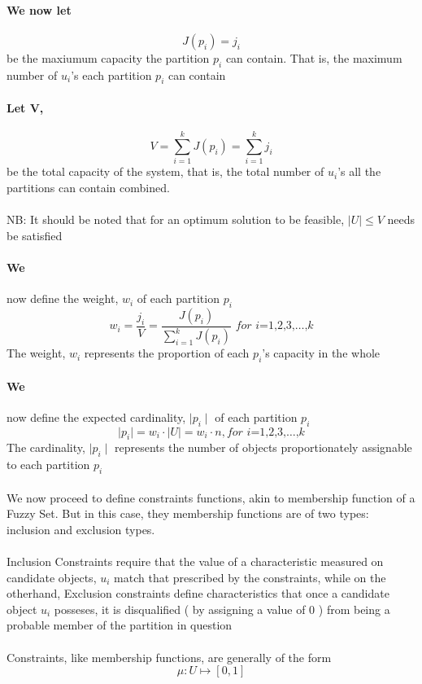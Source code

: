 \documentclass{article}
\begin{document}
		\paragraph{We now let}
			\[
				J(p_i) = j_i
			\]
			be the maxiumum capacity the partition $p_i$ can contain. That is, the maximum number of $u_i$'s each partition $p_i$ can contain
		\paragraph{Let V,}
			\[
				V = \sum_{ i = 1 }^{k}{J(p_i)} = \sum_{i=1}^{k}{j_i}
			\]
			be the total capacity of the system, that is, the total number of $u_i$'s all the partitions can contain combined.\\ \\
			NB: It should be noted that for an optimum solution to be feasible, $\mid U \mid \leq V$ needs be satisfied
		\paragraph{We}
			now define the weight, $w_i$ of each partition $p_i$
			\[
				w_i = \frac{j_i}{V} = \frac{J(p_i)}{\sum_{i=1}^{k}{J(p_i)}}  \textit{ for i=1,2,3,}\dots\text{,}k
			\]
			The weight, $w_i$ represents the proportion of each $p_i$'s capacity in the whole
		\paragraph{We}
			now define the expected cardinality, $\mid p_i \mid$ of each partition $p_i$
			\[
				\mid p_i \mid = w_i \cdot \mid U \mid = w_i \cdot n, \textit{for i=1,2,3,}\dots\text{,}k
			\]
			The cardinality, $\mid p_i \mid$ represents the number of objects proportionately assignable to each partition $p_i$
		\paragraph{}
			We now proceed to define constraints functions, akin to membership function of a Fuzzy Set. But in this case, they membership functions are of two types: inclusion and exclusion types.\\ \\
			Inclusion Constraints require that the value of a characteristic measured on candidate objects, $u_i$ match that prescribed by the constraints, while on the otherhand, Exclusion constraints define characteristics that once a candidate object $u_i$ posseses, it is disqualified ( by assigning a value of 0 ) from being a probable member of the partition in question\\ \\
			Constraints, like membership functions, are generally of the form
			\[
				\mu \colon U \mapsto [ 0,1 ]
			\]
			
\end{document}
